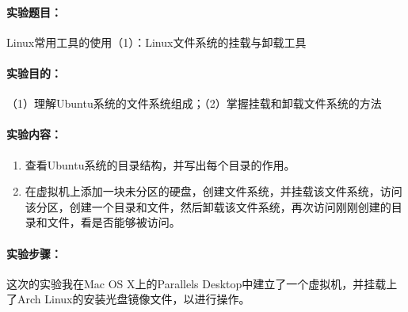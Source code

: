 \documentclass[cs4size,a4paper,nofonts]{ctexart}
\def\titlec{Linux常用工具的使用（1）：Linux文件系统的挂载与卸载工具}
\begin{document}




\paragraph{实验题目：}\titlec

\paragraph{实验目的：}（1）理解Ubuntu系统的文件系统组成；（2）掌握挂载和卸载文件系统的方法

\paragraph{实验内容：}
\begin{enumerate}
\item 查看Ubuntu系统的目录结构，并写出每个目录的作用。
\item 在虚拟机上添加一块未分区的硬盘，创建文件系统，并挂载该文件系统，访问该分区，创建一个目录和文件，然后卸载该文件系统，再次访问刚刚创建的目录和文件，看是否能够被访问。
\end{enumerate}

\paragraph{实验步骤：}\quad

\newcommand{\image}[3][height=10cm]{%
    \centering
    \texttt{[image: images/exp4/\#2.png]}
    \caption{#3}
    \label{fig:#3}
}

这次的实验我在Mac OS X上的Parallels Desktop中建立了一个虚拟机，并挂载上了Arch Linux的安装光盘镜像文件，以进行操作。
\end{document}
